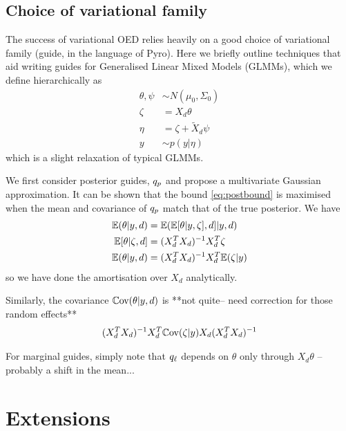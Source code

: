 \subsection{Choice of variational family}
The success of variational OED relies heavily on a good choice of variational family (guide, in the language of Pyro). Here we briefly outline techniques that aid writing guides for Generalised Linear Mixed Models (GLMMs), which we define hierarchically as
\begin{align}
	\theta, \psi &\sim N(\mu_0, \Sigma_0) \\
	\zeta &= X_d\theta \\
	\eta &= \zeta + \tilde{X}_d \psi \\
	y &\sim p(y|\eta)
\end{align}
which is a slight relaxation of typical GLMMs.

We first consider posterior guides, $q_p$ and propose a multivariate Gaussian approximation. It can be shown that the bound \eqref{eq:postbound} is maximised when the mean and covariance of $q_p$ match that of the true posterior. We have
\begin{align}
	\mathbb{E}(\theta|y, d) &= \mathbb{E}(\mathbb{E}[\theta|y,\zeta], d]|y, d) \\
	\mathbb{E}[\theta|\zeta, d] &= (X_d^T X_d)^{-1}X_d^T \zeta \\
	\mathbb{E}(\theta|y, d) &= (X_d^T X_d)^{-1}X_d^T \mathbb{E}(\zeta|y)
\end{align}
so we have done the amortisation over $X_d$ analytically.

Similarly, the covariance $\mathbb{C}\text{ov}(\theta|y,d)$ is
**not quite-- need correction for those random effects**
\begin{align}
	(X_d^TX_d)^{-1}X_d^T\mathbb{C}\text{ov}(\zeta|y)X_d(X_d^TX_d)^{-1}
\end{align}

For marginal guides, simply note that $q_\ell$ depends on $\theta$ only through $X_d\theta$ --probably a shift in the mean...





\section{Extensions}
